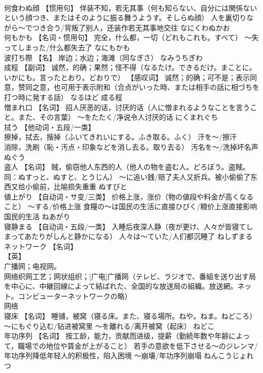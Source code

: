 \documentclass[8pt]{extreport}
\begin{document}
\begin{CJK}{UTF8}{min}
\\	何食わぬ顔	【惯用句】 佯装不知，若无其事（何も知らない、自分には関係ないという顔つき、またはそのように振る舞うようす。そしらぬ顔） 人を裏切りながら～でつき合う/背叛了别人，还装作若无其事地交往	なにくわぬかお	
\\	何もかも	【名词・惯用句】 完全，什么都，一切（どれもこれも。すべて） ～失ってしまった/什么都失去了	なにもかも	
\\	波打ち際	【名】 岸边；水边；海滩（同なぎさ）	なみうちぎわ	
\\	成程	【副词】 诚然，的确；果然；怪不得（なるたけ。できるだけ。まことに。いかにも。言ったとおり。どおりで） 【感叹词】 诚然；的确；可不是；表示同意，赞同之意，也可用于表示附和（合点がいった時、または相手の話に相づちを打つ時に発する話）	なるほど	成る程
\\	憎まれ口	【名词】 招人厌恶的话，讨厌的话（人に憎まれるようなことを言うこと。また、その言葉） ～をたたく/净说令人讨厌的话	にくまれぐち	
\\	拭う	【他动词・五段/一类】 
\\	擦掉，拭去，揩掉（ふいてきれいにする。ふき取る。ふく） 汗を～/擦汗 
\\	消除，洗刷（恥・汚点・印象などを消し去る。取り去る） 汚名を～/洗掉坏名声	ぬぐう	
\\	盗人	【名词】 贼，偷窃他人东西的人（他人の物を盗む人。どろぼう。盗賊。同：ぬすっと、ぬすと、とうじん） ～に追い銭/赔了夫人又折兵。被小偷偷了东西又给小偷前，比喻损失重重	ぬすびと	
\\	値上がり	【自动词・サ变/三类】 价格上涨，涨价（物の値段や料金が高くなること） ～する/价格上涨 食糧の～は国民の生活に直接ひびく/粮价上涨直接影响国民的生活	ねあがり	
\\	寝静まる	【自动词・五段/一类】 入睡后夜深人静（夜が更け、人々が皆寝てしまってあたりがしんと静かになる） 人々は～ていた/人们都沉睡了	ねしずまる	
\\	ネットワーク	【名词】 
\\	【英】
\\	广播网；电视网。
\\	网络织网工艺；网状组织；[广电]广播网（テレビ、ラジオで、番組を送り出す局を中心に、中継回線によって結ばれた、全国的な放送局の組織。放送網。ネット。コンビューターネットワークの略） 
\\	网络		
\\	寝床	【名词】 睡铺，被窝（寝る床。また、寝る場所。ねや。ねま。ねどころ） ～にもぐり込む/钻进被窝里 ～を離れる/离开被窝（起床）	ねどこ	
\\	年功序列	【名词】 按工龄，能力，贡献而进级，提薪（勤続年数や年齢によって，職場での地位や賃金が上がること） 若手の意欲を低下させる～のジレンマ/年功序列降低年轻人的积极性，陷入困境 ～崩壊/年功序列崩塌	ねんこうじょれつ	

\end{CJK}
\end{document}
